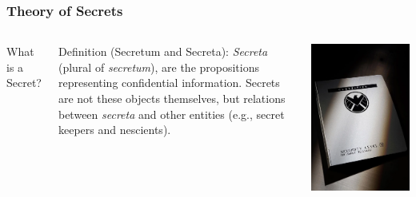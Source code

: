\documentclass[aspectratio=169]{beamer}
\begin{document}
\begin{frame}
\frametitle{Theory of Secrets}

\begin{columns}[c]


\Large What is a Secret?

\vspace{1em}

\begin{block}{Definition (Secretum and Secreta):}  
\emph{Secreta} (plural of \emph{secretum}), are the propositions representing confidential information.  
Secrets are not these objects themselves, but relations between \emph{secreta} and other entities (e.g., secret keepers and nescients).
\end{block}


\centering
\includegraphics[width=\linewidth]{images/shield.png}

\end{columns}

\end{frame}
\end{document}
